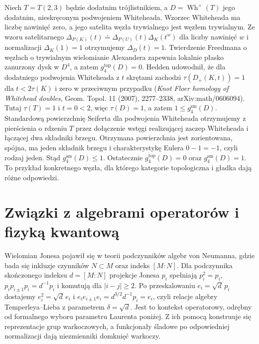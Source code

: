 \begin{przyklad}
Niech $T=T(2,3)$ będzie dodatnim trójlistnikiem,
a $D=\operatorname{Wh}^{+}(T)$ jego dodatnim,
nieskręconym podwojeniem Whiteheada. Wzorzec
Whiteheada ma liczbę nawinięć zero, a jego
satelita węzła trywialnego jest węzłem trywialnym.
Ze wzoru satelitarnego
$\Delta_{P(K)}(t)\doteq\Delta_{P(U)}(t)\Delta_K(t^w)$
dla liczby nawinięć $w$ i normalizacji $\Delta_K(1)=1$
otrzymujemy $\Delta_D(t)=1$.
Twierdzenie Freedmana o węzłach o trywialnym
wielomianie Alexandera zapewnia lokalnie płasko
zanurzony dysk w $D^4$, a zatem
$g_4^{\mathrm{top}}(D)=0$.
Hedden udowodnił, że dla dodatniego podwojenia
Whiteheada z $t$ skrętami zachodzi
$\tau(D_+(K,t))=1$ dla $t<2\tau(K)$
i zero w przeciwnym przypadku
(\emph{Knot Floer homology of Whitehead doubles},
Geom. Topol. 11 (2007), 2277--2338,
arXiv:math/0606094). Tutaj $\tau(T)=1$ i
$t=0<2$, więc $\tau(D)=1$, a zatem
$1\leq g_4^{\mathrm{sm}}(D)$. Standardową powierzchnię Seiferta dla podwojenia
Whiteheada otrzymujemy z pierścienia o rdzeniu $T$
przez dołączenie wstęgi realizującej zaczep
Whiteheada i łączącej dwa składniki brzegu.
Otrzymana powierzchnia jest zorientowana,
spójna, ma jeden składnik brzegu i
charakterystykę Eulera $0-1=-1$, czyli rodzaj jeden.
Stąd
$g_4^{\mathrm{sm}}(D)\leq1$.
Ostatecznie
$g_4^{\mathrm{top}}(D)=0$ oraz $g_4^{\mathrm{sm}}(D)=1$.
To przykład konkretnego węzła, dla którego kategorie
topologiczna i gładka dają różne odpowiedzi.
\end{przyklad}

\section{Związki z algebrami operatorów i fizyką kwantową}
\label{sec:kt-operator}

Wielomian Jonesa pojawił się w teorii podczynników algebr
von Neumanna, gdzie bada się inkluzje czynników
$N\subset M$ oraz indeks $[M:N]$. Dla podczynnika skończonego indeksu $d=[M:N]$
projekcje Jonesa $p_i$ spełniają
$p_i^2=p_i$, $p_i p_{i\pm1}p_i=d^{-1}p_i$
i komutują dla $|i-j|\ge2$.
Po przeskalowaniu $e_i=\sqrt d\,p_i$ dostajemy
$e_i^2=\sqrt d\,e_i$ i
$e_i e_{i\pm1}e_i=d^{3/2}d^{-1}p_i=e_i$,
czyli relacje algebry Temperleya--Lieba
z parametrem $\delta=\sqrt d$. Jest to kontekst
operatorowy, odrębny od formalnego wyboru
parametru Laurenta poniżej. Z ich pomocą konstruuje się
reprezentacje grup warkoczowych, a funkcjonały śladowe
po odpowiedniej normalizacji dają niezmienniki domknięć
warkoczy.

